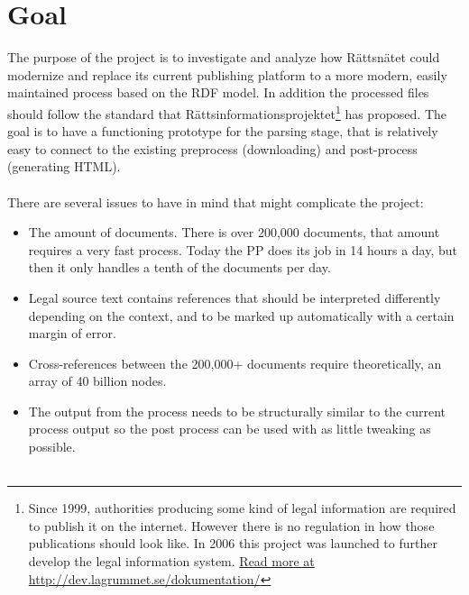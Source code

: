 \documentclass[12pt]{report}
\begin{document}
\section*{Goal}
The purpose of the project is to investigate and analyze how Rättsnätet could modernize and replace its current publishing platform to a more modern, easily maintained process based on the RDF model. In addition the processed files should follow the standard that Rättsinformationsprojektet\footnote[4]{Since 1999, authorities producing some kind of legal information are required
to publish it on the internet. However there is no regulation in how those publications should look like. In 2006 this project was launched to further develop the legal information system. \href{http://dev.lagrummet.se/dokumentation/}{Read more at http://dev.lagrummet.se/dokumentation/}} has proposed. The goal is to have a functioning prototype for the parsing stage, that is relatively easy to connect to the existing preprocess (downloading) and post-process (generating HTML). \\\\
There are several issues to have in mind that might complicate the project: 
\begin{itemize} 
\item The amount of documents. There is over 200,000 documents, that amount requires a very fast process. Today the PP does its job in 14 hours a day, but then it only handles a tenth of the documents per day. 
\item Legal source text contains references that should be interpreted differently depending on the context, and to be marked up automatically with a certain margin of error.
\item Cross-references between the 200,000+ documents require theoretically, an array of 40 billion nodes.
\item The output from the process needs to be structurally similar to the current process output so the post process can be used with as little tweaking as possible.\\\\
\end{itemize}

\pagebreak
\end{document}
